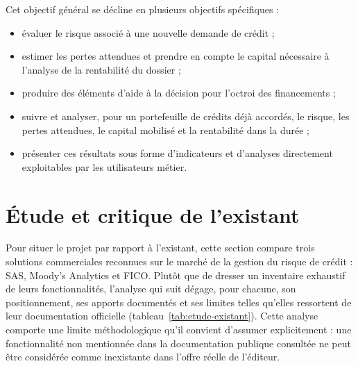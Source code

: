 Cet objectif général se décline en plusieurs objectifs spécifiques :

\begin{itemize}
    \item évaluer le risque associé à une nouvelle demande de crédit ;
    \item estimer les pertes attendues et prendre en compte le capital nécessaire à l'analyse de la rentabilité du dossier ;
    \item produire des éléments d'aide à la décision pour l'octroi des financements ;
    \item suivre et analyser, pour un portefeuille de crédits déjà accordés, le risque, les pertes attendues, le capital mobilisé et la rentabilité dans la durée ;
    \item présenter ces résultats sous forme d'indicateurs et d'analyses directement exploitables par les utilisateurs métier.
\end{itemize}

\section{Étude et critique de l'existant}

Pour situer le projet par rapport à l'existant, cette section compare trois solutions commerciales reconnues sur le marché de la gestion du risque de crédit : SAS, Moody's Analytics et FICO. Plutôt que de dresser un inventaire exhaustif de leurs fonctionnalités, l'analyse qui suit dégage, pour chacune, son positionnement, ses apports documentés et ses limites telles qu'elles ressortent de leur documentation officielle (tableau~\ref{tab:etude-existant}). Cette analyse comporte une limite méthodologique qu'il convient d'assumer explicitement : une fonctionnalité non mentionnée dans la documentation publique consultée ne peut être considérée comme inexistante dans l'offre réelle de l'éditeur.

